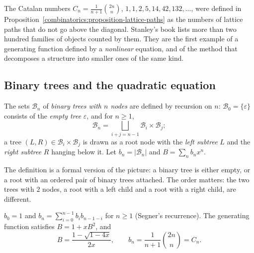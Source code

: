 The Catalan numbers $C_n = \frac{1}{n + 1}\binom{2n}{n}$, $1, 1, 2, 5, 14, 42, 132, \ldots$, were defined in Proposition~\ref{combinatorics:proposition-lattice-paths} as the numbers of lattice paths
that do not go above the diagonal. Stanley's book \cite{stanley-catalan} lists more than two hundred families of objects counted by them. They are the first example of a generating function defined
by a \emph{nonlinear} equation, and of the method that decomposes a structure into smaller ones of the same kind.

\subsection{Binary trees and the quadratic equation}\label{generating-functions:subsection-binary-trees}

\begin{definition}\label{generating-functions:definition-binary-tree}
The sets $\mathcal{B}_n$ of \emph{binary trees with $n$ nodes} are defined by recursion on $n$: $\mathcal{B}_0 = \{\varepsilon\}$ consists of the \emph{empty tree} $\varepsilon$, and for $n \geq 1$,
\[
\mathcal{B}_n = \bigsqcup_{i + j = n - 1}\mathcal{B}_i \times \mathcal{B}_j;
\]
a tree $(L, R) \in \mathcal{B}_i \times \mathcal{B}_j$ is drawn as a root node with the \emph{left subtree} $L$ and the \emph{right subtree} $R$ hanging below it. Let $b_n = |\mathcal{B}_n|$ and
$B = \sum_nb_nx^n$.
\end{definition}

The definition is a formal version of the picture: a binary tree is either empty, or a root with an ordered pair of binary trees attached. The order matters: the two trees with $2$ nodes, a root with a
left child and a root with a right child, are different.

\begin{theorem}\label{generating-functions:theorem-catalan}
$b_0 = 1$ and $b_n = \sum_{i=0}^{n-1}b_ib_{n-1-i}$ for $n \geq 1$ (Segner's recurrence). The generating function satisfies $B = 1 + xB^2$, and
\[
B = \frac{1 - \sqrt{1 - 4x}}{2x}, \qquad b_n = \frac{1}{n + 1}\binom{2n}{n} = C_n.
\]
\end{theorem}

